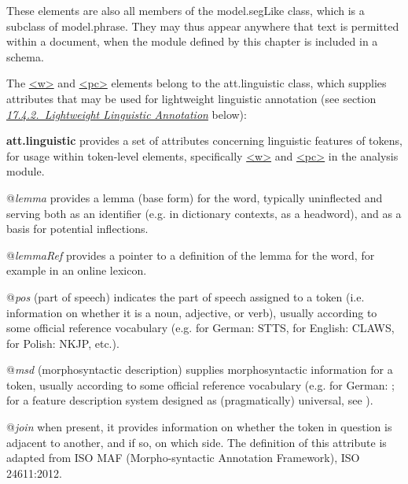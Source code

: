 \par
These elements are also all members of the \textsf{model.segLike} class, which is a subclass of \textsf{model.phrase}. They may thus appear anywhere that text is permitted within a document, when the module defined by this chapter is included in a schema.\par
The \hyperref[TEI.w]{<w>} and \hyperref[TEI.pc]{<pc>} elements belong to the \textsf{att.linguistic} class, which supplies attributes that may be used for lightweight linguistic annotation (see section \textit{\hyperref[AILALW]{17.4.2.\ Lightweight Linguistic Annotation}} below): 
\begin{sansreflist}
  
\item [\textbf{att.linguistic}] provides a set of attributes concerning linguistic features of tokens, for usage within token-level elements, specifically \hyperref[TEI.w]{<w>} and \hyperref[TEI.pc]{<pc>} in the analysis module.\hfil\\[-10pt]\begin{sansreflist}
    \item[@{\itshape lemma}]
  provides a lemma (base form) for the word, typically uninflected and serving both as an identifier (e.g. in dictionary contexts, as a headword), and as a basis for potential inflections.
    \item[@{\itshape lemmaRef}]
  provides a pointer to a definition of the lemma for the word, for example in an online lexicon.
    \item[@{\itshape pos}]
  (part of speech) indicates the part of speech assigned to a token (i.e. information on whether it is a noun, adjective, or verb), usually according to some official reference vocabulary (e.g. for German: STTS, for English: CLAWS, for Polish: NKJP, etc.).
    \item[@{\itshape msd}]
  (morphosyntactic description) supplies morphosyntactic information for a token, usually according to some official reference vocabulary (e.g. for German: ; for a feature description system designed as (pragmatically) universal, see ).
    \item[@{\itshape join}]
  when present, it provides information on whether the token in question is adjacent to another, and if so, on which side. The definition of this attribute is adapted from ISO MAF (Morpho-syntactic Annotation Framework), ISO 24611:2012.
\end{sansreflist}  
\end{sansreflist}

